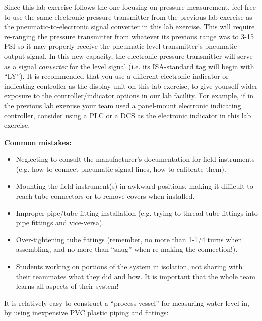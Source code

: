 Since this lab exercise follows the one focusing on pressure measurement, feel free to use the same electronic pressure transmitter from the previous lab exercise as the pneumatic-to-electronic signal converter in this lab exercise.  This will require re-ranging the pressure transmitter from whatever its previous range was to 3-15 PSI so it may properly receive the pneumatic level transmitter's pneumatic output signal.  In this new capacity, the electronic pressure transmitter will serve as a signal {\it converter} for the level signal (i.e. its ISA-standard tag will begin with ``LY'').  It is recommended that you use a different electronic indicator or indicating controller as the display unit on this lab exercise, to give yourself wider exposure to the controller/indicator options in our lab facility.  For example, if in the previous lab exercise your team used a panel-mount electronic indicating controller, consider using a PLC or a DCS as the electronic indicator in this lab exercise.

\vskip 10pt

{\bf Common mistakes:}

\begin{itemize}
\item{} Neglecting to consult the manufacturer's documentation for field instruments (e.g. how to connect pneumatic signal lines, how to calibrate them).
\item{} Mounting the field instrument(s) in awkward positions, making it difficult to reach tube connectors or to remove covers when installed.
\item{} Improper pipe/tube fitting installation (e.g. trying to thread tube fittings into pipe fittings and vice-versa).
\item{} Over-tightening tube fittings (remember, no more than 1-1/4 turns when assembling, and no more than ``snug'' when re-making the connection!).
\item{} Students working on portions of the system in isolation, not sharing with their teammates what they did and how.  It is important that the whole team learns all aspects of their system!
\end{itemize}

\vskip 10pt

\vfil \eject

It is relatively easy to construct a ``process vessel'' for measuring water level in, by using inexpensive PVC plastic piping and fittings:

